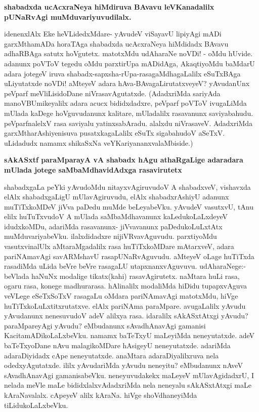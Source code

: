 {\bigskip
\noindent
{\large\bf shabadxda ucAcxraNeya hiMdiruva BAvavu leVKanadalilx pUNaRvAgi muMduvariyuvudilalx.}}\label{page181}
\medskip

\noindent
idenenxlAlx Eke heVLidedxMdare- yAvudeV viSayavU lipiyAgi mADi garxMthamADa horaTAga shabadxda ucAcxraNeya hiMdidadx BAvavu adhaRBAga satutx hoVgutetx. matotxMdu udAharaNe noVDi! - oMdu hUvide. adanunx poVToV tegedu oMdu parxtirUpa mADidAga, AkaqtiyoMdu baMdarU adara jotegeV iruva shabadx-sapxsha-rUpa-rasagaMdhagaLalilx eSuTxBAga uLiyutatxde noVDi! aMteyeV adara hAva-BAvagaLirutatxveyeV? yAvudanUnx peVparf meVliLisidoDane niVrasavAgutatxde. (AdadxriMda sariyAda manoVBUmikeyalilx adara acucx bididxdadxre, peVparf poVToV ivugaLiMda mUlada kaDege hoVguvudanunx kalitare, mUladalilx rasavanunx saviyabahudu. peVparfnalelxV rasa saviyalu yatinxsabAradu. alalxdu niVrasaveV. AdadxriMda garxMtharAshiyenisuva pusatxkagaLalilx eSuTx sigabahudoV aSeTxV. uLidadudx namamx shikaSxNa veYKariyananxvalaMbiside.)

{\bigskip
\noindent
{\large\bf sAkASxtf paraMparayA vA shabadx hAgu athaRgaLige adaradara mUlada jotege saMbaMdhavidAdxga rasavirutetx}}\label{page181a}
\medskip

\noindent
shabadxgaLa peYki yAvudoMdu nitayxvAgiruvudoV A shabadxveV, vishavxda elAlx shabadxgaLigU mUlavAgiruvudu, elAlx shabadxrAshiyU adanunx muTiTxkoMDeV jiVva paDedu muMde beLeyabeVku. yAvudeV vasutxvU, tAnu elilx huTuTxvudoV A mUlada saMbaMdhavanunx kaLedukoLaLxdeyeV idudxkoMDu, adariMda rasavanunx- jiVvavanunx paDedukoLuLxtAtx muMduvariyabeVku. ilalxdidadxre nijiVRvavAguvudu. parxtiyoMdu vasutxvinalUlx aMtaraMgadalilx rasa huTiTxkoMDare mAtarxveV, adara pariNAmavAgi savARMshavU rasapUNaRvAguvudu. aMteyeV oLage huTiTxda rasadiMda uLida beVre beVre rasagaLU utapxnanxvAguvuvu. udAharaNege:- beVlada haNuNx modalige tikatx(kahi) rasavAgirutetx. naMtara huLi rasa, ogaru rasa, konege madhurarasa. hAlinalilx modaliMda hiDidu tupapxvAguva veVLege eSeTxSoTxV rasagaLu oMdara pariNAmavAgi matotxMdu, hiVge huTiTxkoLuLxtitxrutatxve. elAlx pariNAma paraMpare. avugaLalilx yAvudu yAvudanunx nenesuvudoV adeV alilxya rasa. idaralilx sAkASxtAtxgi yAvudu? paraMpareyAgi yAvudu? eMbudanunx sAvadhAnavAgi gamanisi KacitamADikoLaLxbeVku. namamx baTeTxyU maLeyiMda neneyutatxde. adeV baTeTxyoDane nAvu malagikoMDare hAsigeyU neneyutatxde. adariMda adaraDiyidadx cApe neneyutatxde. anaMtara adaraDiyalilxruva nela odedxyAgutatxde. ililx yAvudariMda yAvudu neneyitu? eMbudanunx nAveV sAvadhAnavAgi gamanisabeVku. neneyuvudakekx maLeyeV mUlavAgidadxrU, I nelada meVle maLe bididxlalxvAdadxriMda nela neneyalu sAkASxtAtxgi maLe kAraNavalalx. cApeyeV alilx kAraNa. hiVge shoVdhaneyiMda tiLidukoLaLxbeVku.

